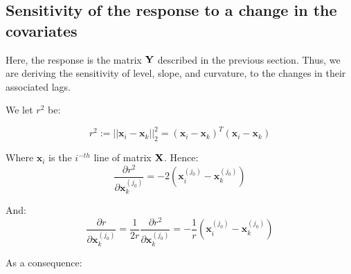 \subsection{Sensitivity of the response to a change in the covariates}
\label{sec:sensitivity}

Here, the response is the matrix ${\bf Y}$ described in the previous section. Thus, we are deriving the sensitivity of level, slope, and curvature, to the changes in their associated lags. 

\medskip

We let $r^2$ be:

$$
r^2 := || \textbf{x}_i - \textbf{x}_k ||^2_2 = (\textbf{x}_i - \textbf{x}_k)^T(\textbf{x}_i - \textbf{x}_k)
$$

Where $\textbf{x}_i$ is the $i^{-th}$ line of matrix ${\bf X}$. Hence:
$$
\frac{\partial r^2}{\partial \textbf{x}_k^{(j_0)}} = -2\left(\textbf{x}_i^{(j_0)} - \textbf{x}_k^{(j_0)} \right)
$$

And:
$$
\frac{\partial r}{\partial \textbf{x}_k^{(j_0)}} = \frac{1}{2r}\frac{\partial r^2}{\partial \textbf{x}_k^{(j_0)}} = -\frac{1}{r}\left(\textbf{x}_i^{(j_0)} - \textbf{x}_k^{(j_0)} \right)
$$


As a consequence: 

